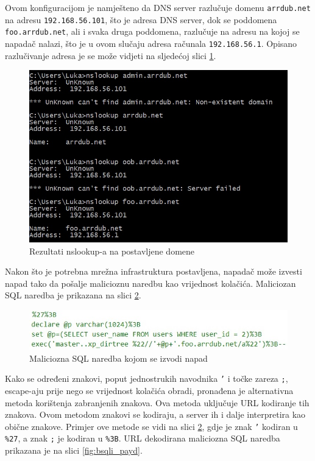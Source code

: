 \documentclass[12pt, oneside, onecolumn]{book}
\begin{document}
{Ovom konfiguracijom je namješteno da DNS server razlučuje domenu \texttt{arrdub.net} na adresu \texttt{192.168.56.101}, što je adresa DNS server, dok se poddomena \texttt{foo.arrdub.net}, ali i svaka druga poddomena, razlučuje na adresu na kojoj se napadač nalazi, što je u ovom slučaju adresa računala \texttt{192.168.56.1}. Opisano razlučivanje adresa je se može vidjeti na sljedećoj slici \ref{fig:bsqli_nsl}.

\begin{figure}[H]
	\begin{center}
		\includegraphics[width=\textwidth]{bsqli_nsl.jpg}
		\caption{Rezultati nslookup-a na postavljene domene} \label{fig:bsqli_nsl}
	\end{center}
\end{figure}

Nakon što je potrebna mrežna infrastruktura postavljena, napadač može izvesti napad tako da pošalje malicioznu naredbu kao vrijednost kolačića. Maliciozan SQL naredba je prikazana na slici \ref{fig:bsqli_pay}.

\begin{figure}[H]
	\begin{center}
		\includegraphics[width=\textwidth]{bsqli_pay.jpg}
		\caption{Maliciozna SQL naredba kojom se izvodi napad} \label{fig:bsqli_pay}
	\end{center}
\end{figure}

Kako se određeni znakovi, poput jednostrukih navodnika \texttt{'} i točke zareza \texttt{;}, escape-aju prije nego se vrijednost kolačića obradi, pronađena je alternativna metoda korištenja zabranjenih znakova. Ova metoda uključuje URL kodiranje tih znakova. Ovom metodom znakovi se kodiraju, a server ih i dalje interpretira kao obične znakove. Primjer ove metode se vidi na slici \ref{fig:bsqli_pay}, gdje je znak \texttt{'} kodiran u \texttt{\%27}, a znak \texttt{;} je kodiran u \texttt{\%3B}. URL dekodirana maliciozna SQL naredba prikazana je na slici \ref{fig:bsqli_payd}.

}
\end{document}
